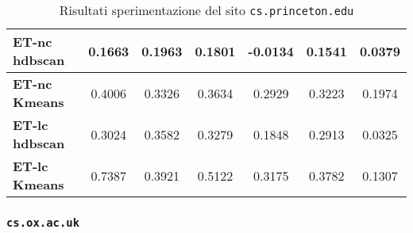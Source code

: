 \begin{table}[H]
\begin{tabular}{| l | c | c | c | c | c | c |}
	\textbf{ET-nc hdbscan} & 0.1663 & 0.1963 & 0.1801 & -0.0134 & 0.1541 & 0.0379\\ [2ex]
	 \hline
	\textbf{ET-nc Kmeans} & 0.4006 & 0.3326 & 0.3634 & 0.2929 & 0.3223 & 0.1974\\ [2ex]
	 \hline	
	\textbf{ET-lc hdbscan} & 0.3024 & 0.3582 & 0.3279 & 0.1848 & 0.2913 & 0.0325\\ [2ex]
	\hline
	\textbf{ET-lc Kmeans} & 0.7387 & 0.3921 & 0.5122 & 0.3175 & 0.3782 & 0.1307\\ [2ex]
	\hline
	
	\end{tabular}
	\caption{Risultati sperimentazione del sito \texttt{cs.princeton.edu}}
	\label{metrichePrinc}
\end{table}

\subsubsection{\texttt{cs.ox.ac.uk}}

